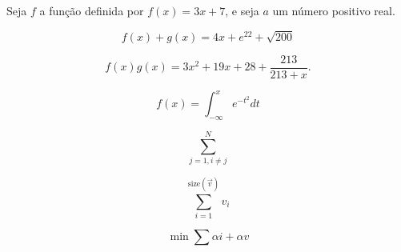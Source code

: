 \documentclass[a4paper,12pt]{article}
\begin{document}
  Seja $f$ a função definida por $f(x) = 3x + 7$, e seja $a$ um número positivo real.

  \begin{equation}
    f(x) + g(x) = 4x + e^{22} + \sqrt{200}
  \end{equation}

  \begin{equation}
    f(x)g(x) = 3x^2 + 19x + 28 + \frac{213}{213+x}.
  \end{equation}

  \begin{equation}
    f(x)=\int_{-\infty}^x e^{-t^2}dt
  \end{equation}
  
  \begin{equation}
    \sum_{j=1,i \neq j}^{N}
  \end{equation}
  
  \begin{equation}
    \sum\limits_{i=1}^{\mbox{size}(\vec{v})}v_i
  \end{equation}
  
  \begin{equation}
    \min \sum \alpha i + \alpha v 
  \end{equation}
  
\end{document}
